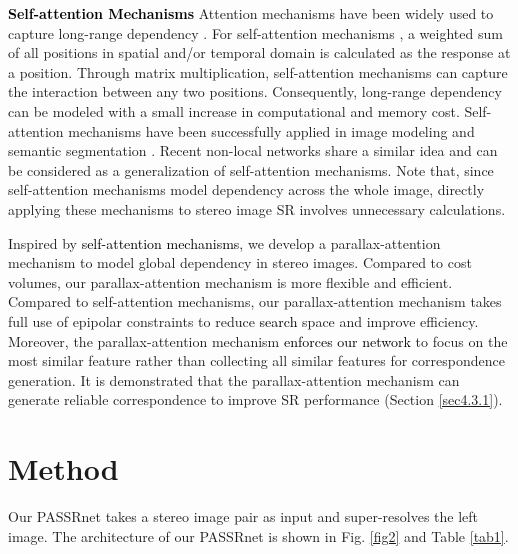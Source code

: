 \documentclass[10pt,twocolumn,letterpaper]{article}
\begin{document}
\noindent
\textbf{\textcolor{black}{Self-attention Mechanisms}}
Attention mechanisms have been widely used to capture long-range dependency \cite{2015-DRAW:aRecurrentNeuralNetworkforImageGeneration-Gregor-1462-1471,2015-ShowAttendandTell:NeuralImageCaptionGenerationwithVisualAttention-Xu-2048-2057a}. For self-attention mechanisms \cite{2017-AttentionIsAllYouNeed-Vaswani-6000-6010,2018-SelfAttentionGenerativeAdversarialNetworks-Zhang--,2018-DualAttentionNetworkforSceneSegmentation-Fu--}, a weighted sum of all positions in spatial and/or temporal domain is calculated as the response at a position. Through matrix multiplication, self-attention mechanisms can capture the interaction between any two positions. Consequently, long-range dependency can be modeled with a small increase in computational and memory cost. Self-attention mechanisms have been successfully applied in image modeling \cite{2018-SelfAttentionGenerativeAdversarialNetworks-Zhang--} and semantic segmentation \cite{2018-DualAttentionNetworkforSceneSegmentation-Fu--}. Recent non-local networks \cite{2018-NonLocalNeuralNetworks-Wang--,2018-NonLocalRecurrentNetworkforImageRestoration-Liu--} share a similar idea and can be considered as a generalization of self-attention mechanisms. Note that, since self-attention mechanisms model dependency across the whole image, directly applying these mechanisms to stereo image SR involves unnecessary calculations.

Inspired by \textcolor{black}{self-attention mechanisms}, we develop a parallax-attention mechanism to model global dependency in stereo images. Compared to cost volumes, our parallax-attention mechanism is more flexible and efficient. Compared to self-attention mechanisms, our parallax-attention mechanism takes full use of epipolar constraints to reduce \textcolor{black}{search} space and improve efficiency. Moreover, the parallax-attention mechanism \textcolor{black}{enforces our network} to focus on the most similar feature rather than collecting all similar features for correspondence generation. It is demonstrated that the parallax-attention mechanism can generate reliable correspondence to improve SR performance (Section \ref{sec4.3.1}).

\section{Method}

Our PASSRnet takes a stereo image pair as input and super-resolves the left image. The architecture of our PASSRnet is shown in Fig. \ref{fig2} and Table \ref{tab1}.
\end{document}
